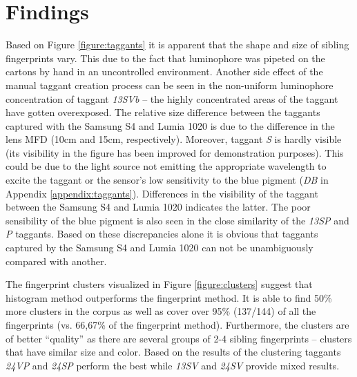 \documentclass[thesis.tex]{subfiles}
\begin{document}
\section{Findings}
\label{chapter:findings}

Based on Figure \ref{figure:taggants} it is apparent that the shape and size of sibling fingerprints vary. This due to the fact that luminophore was pipeted on the cartons by hand in an uncontrolled environment. Another side effect of the manual taggant creation process can be seen in the non-uniform luminophore concentration of taggant \emph{13SVb} -- the highly concentrated areas of the taggant have gotten overexposed. The relative size difference between the taggants captured with the Samsung S4 and Lumia 1020 is due to the difference in the lens MFD (10cm and 15cm, respectively). Moreover, taggant \emph{S} is hardly visible (its visibility in the figure has been improved for demonstration purposes). This could be due to the light source not emitting the appropriate wavelength to excite the taggant or the sensor's low sensitivity to the blue pigment (\emph{DB} in Appendix \ref{appendix:taggants}). Differences in the visibility of the taggant between the Samsung S4 and Lumia 1020 indicates the latter. The poor sensibility of the blue pigment is also seen in the close similarity of the \emph{13SP} and \emph{P} taggants. Based on these discrepancies alone it is obvious that taggants captured by the Samsung S4 and Lumia 1020 can not be unambiguously compared with another.

The fingerprint clusters visualized in Figure \ref{figure:clusters} suggest that histogram method outperforms the fingerprint method. It is able to find 50\% more clusters in the corpus as well as cover over 95\% (137/144) of all the fingerprints (vs. 66,67\% of the fingerprint method). Furthermore, the clusters are of better ``quality'' as there are several groups of 2-4 sibling fingerprints -- clusters that have similar size and color. Based on the results of the clustering taggants \emph{24VP} and \emph{24SP} perform the best while \emph{13SV} and \emph{24SV} provide mixed results.
\end{document}
